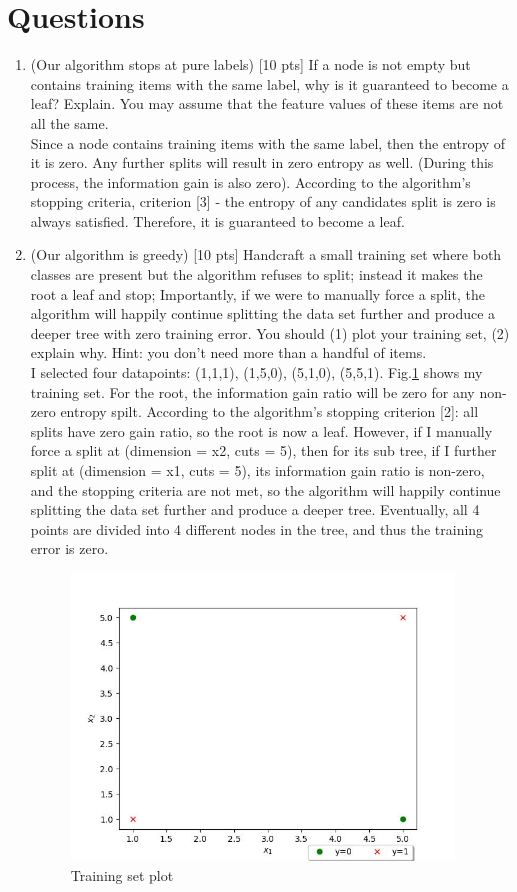 \documentclass[a4paper]{article}
\theoremstyle{definition}
\begin{document}
\section{Questions}
\begin{enumerate}
\item (Our algorithm stops at pure labels) [10 pts] If a node is not empty but contains training items with the same label, why is it guaranteed to become a leaf?  Explain. You may assume that the feature values of these items are not all the same. \\
{\color{blue}
Since a node contains training items with the same label, then the entropy of it is zero. Any further splits will result in zero entropy as well. (During this process, the information gain is also  zero). According to the algorithm's stopping criteria, criterion [3] - the entropy of any candidates split is zero is always satisfied. Therefore, it is guaranteed to become a leaf.
}

\item (Our algorithm is greedy)  [10 pts] Handcraft a small training set where both classes are present but the algorithm refuses to split; instead it makes the root a leaf and stop;
Importantly, if we were to manually force a split, the algorithm will happily continue splitting the data set further and produce a deeper tree with zero training error.
You should (1) plot your training set, (2) explain why.  Hint: you don't need more than a handful of items. \\
{\color{blue}
I selected four datapoints: (1,1,1), (1,5,0), (5,1,0), (5,5,1). Fig.\ref{Q2} shows my training set. For the root, the information gain ratio will be zero for any non-zero entropy spilt. According to the algorithm's stopping criterion [2]: all splits have zero gain ratio, so the root is now a leaf. However, if I manually force a split at (dimension = x2, cuts = 5), then for its sub tree, if I further split at (dimension = x1, cuts = 5), its  information gain ratio is non-zero, and the stopping criteria are not met, so the algorithm will happily continue splitting the data set further and produce a deeper tree. Eventually, all 4 points are divided into 4 different nodes in the tree, and thus the training error is zero.
}

\begin{figure}[htbp]
\centering
\includegraphics[width=4in]{Q2.jpg}
\caption{Training set plot}
\label{Q2}
\end{figure}


\end{enumerate}
\end{document}
